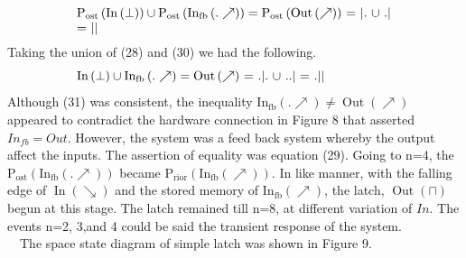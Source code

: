 \documentclass[10pt,journal]{IEEEtran}
\begin{document}
\begin{equation}
 \begin{minipage}{250pt}
\begin{flushleft} $\displaystyle \operatorname{P_{ost}}{\left(\operatorname{In}{\left(\bot \right)} \right)}  \cup  \operatorname{P_{ost}}{\left(\operatorname{In_{fb}}{\left(.\nearrow \right)} \right)} = \operatorname{P_{ost}}{\left(\operatorname{Out}{\left(\nearrow \right)} \right)}$   = $|.$ $\cup$ $.|$ = $||$\end{flushleft}
 \end{minipage}
 \end{equation}
Taking the union of (28) and (30) we had the following.
\begin{equation}
 \begin{minipage}{250pt}
\begin{flushleft} $\displaystyle \operatorname{In}{\left(\bot \right)}  \cup  \operatorname{In_{fb}}{\left(.\nearrow \right)} = \operatorname{Out}{\left(\nearrow \right)}$   = $.|.$ $\cup$ $..|$ = $.||$\end{flushleft}
 \end{minipage}
 \end{equation}
Although (31) was consistent, the inequality $\operatorname{In_{fb}}{\left(.\nearrow \right)} \neq \operatorname{Out}{\left(\nearrow \right)}$ appeared to contradict the     hardware connection in Figure 8 that asserted $In_{fb} = Out$.     However, the system was a feed back system whereby the output affect the     inputs. The assertion of equality was equation (29).    Going to n=4, the $\operatorname{P_{ost}}{\left(\operatorname{In_{fb}}{\left(.\nearrow \right)} \right)}$ became $\operatorname{P_{rior}}{\left(\operatorname{In_{fb}}{\left(\nearrow \right)} \right)}$. In like manner, with the falling edge of  $\operatorname{In}{\left(\searrow \right)}$ and the stored memory of  $\operatorname{In_{fb}}{\left(\nearrow \right)}$, the     latch, $\operatorname{Out}{\left(\sqcap \right)}$ begun at this stage. The latch remained till     n=8, at different variation of $In$. The events n=2, 3,and 4 could be     said the transient response of the system. \\ \ \    The space state diagram of simple latch was shown in Figure 9.
\end{document}

